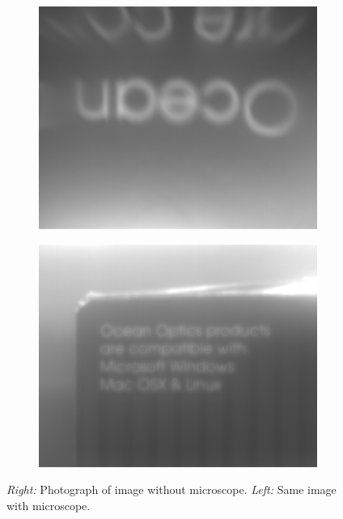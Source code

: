 \documentclass[10pt,a4paper]{article}
\begin{document}
\begin{figure}[t]
\begin{subfigure}{0.5\textwidth}
\includegraphics[width=\textwidth]{../Analysis/Part3-Run5.png}
\end{subfigure}
\begin{subfigure}{0.5\textwidth}
\includegraphics[width=\textwidth]{../Analysis/Part3-Run3.png}
\end{subfigure}
\caption{\textsl{Right:} Photograph of image without microscope. \textsl{Left:} Same image with microscope.}
\end{figure}
\end{document}
